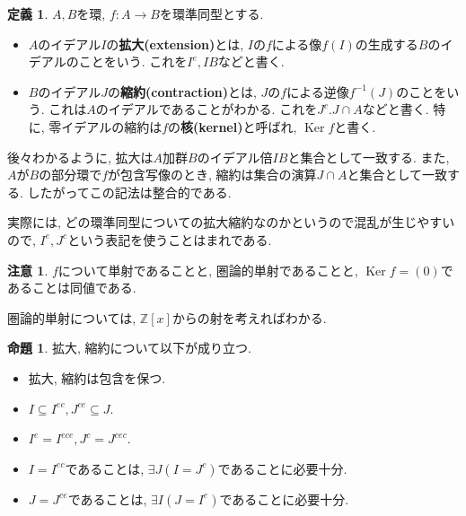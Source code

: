 \documentclass[a4paper, twoside]{bxjsarticle}
\newcommand{\zah}{\mathbb{Z}}
\DeclareMathOperator{\Ker}{Ker}
\newcommand{\tb}{\textbf}
\theoremstyle{definition}
\newtheorem{prop}[thm]{命題}
\newtheorem{defn}[thm]{定義}
\newtheorem{rem}[thm]{注意}
\begin{document}
        \begin{defn}
            $A, B$を環, $f\colon A\to B$を環準同型とする. 
            \begin{itemize}
                \item $A$のイデアル$I$の\tb{拡大(extension)}とは, $I$の$f$による像$f(I)$の生成する$B$のイデアルのことをいう. これを$I^e, IB$などと書く. 
            
                \item $B$のイデアル$J$の\tb{縮約(contraction)}とは, $J$の$f$による逆像$f^{-1}(J)$のことをいう. これは$A$のイデアルであることがわかる. これを$J^c. J\cap A$などと書く. 特に, 零イデアルの縮約は$f$の\tb{核(kernel)}と呼ばれ, $\Ker f$と書く. 
            \end{itemize}

            後々わかるように, 拡大は$A$加群$B$のイデアル倍$IB$と集合として一致する. また, $A$が$B$の部分環で$f$が包含写像のとき, 縮約は集合の演算$J\cap A$と集合として一致する. したがってこの記法は整合的である.

            実際には, どの環準同型についての拡大縮約なのかというので混乱が生じやすいので, $I^e, J^c$という表記を使うことはまれである.
        \end{defn}
        \begin{rem}
            $f$について単射であることと, 圏論的単射であることと, $\Ker f=(0)$であることは同値である.

            圏論的単射については, $\zah[x]$からの射を考えればわかる.
        \end{rem}
        \begin{prop}
            拡大, 縮約について以下が成り立つ.
            \begin{itemize}
                \item 拡大, 縮約は包含を保つ.
                \item $I\subseteq I^{ec}, J^{ce}\subseteq J$.
                \item $I^e = I^{ece}, J^c = J^{cec}$.
                \item $I=I^{ec}$であることは, $\exists J (I=J^c)$であることに必要十分.
                \item $J=J^{ce}$であることは, $\exists I (J=I^e)$であることに必要十分.
            \end{itemize}
        \end{prop}
\end{document}
